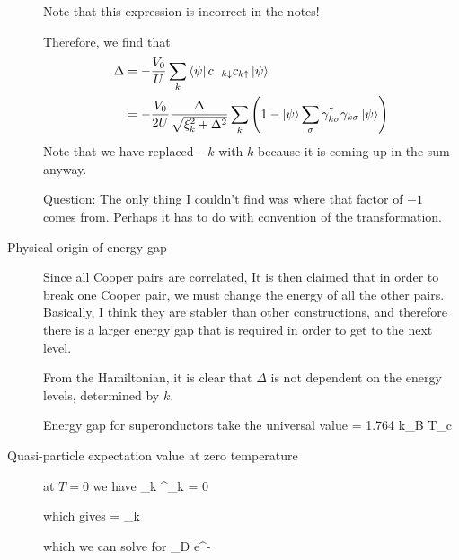 \begin{description}
Note that this expression is incorrect in the notes! 

Therefore, we find that
\begin{align}
\Delta &= - \frac{V_0}{U} \sum_k \left\langle \psi \right| c_{- k \downarrow} c_{k \uparrow} \left| \psi \right\rangle \\
&= - \frac{V_0}{2U} \frac{\Delta}{\sqrt{\xi_k^2 + \Delta^2}} \sum_k \left(1- \left| \psi \right\rangle \sum_\sigma \gamma_{k \sigma}^\dagger \gamma_{k \sigma} \left| \psi \right\rangle  \right)
\end{align}
Note that we have replaced $-k$ with $k$ because it is coming up in the sum anyway. 

Question: The only thing I couldn't find was where that factor of $-1$ comes from. Perhaps it has to do with convention of the transformation. 


\item[Physical origin of energy gap] Since all Cooper pairs are correlated, It is then claimed that in order to break one Cooper pair, we must change the energy of all the other pairs. Basically, I think they are stabler than other constructions, and therefore there is a larger energy gap that is required in order to get to the next level. 

From the Hamiltonian, it is clear that $\Delta$ is not dependent on the energy levels, determined by $k$. 

Energy gap for superonductors take the universal value
\beq
\Delta = 1.764 k_B T_c
\eeq


\item[Quasi-particle expectation value at zero temperature]  at $T = 0$ we have
\beq
\bra{\psi} \gamma_{k \sigma}^\dagger \gamma_{k \sigma} \ket{\psi} = 0
\eeq

which gives
 =  \sum_k 
\eeq

which we can solve for
\beq
\Delta {} \omega_D e^{- }
\eeq


\end{description}
\newpage
